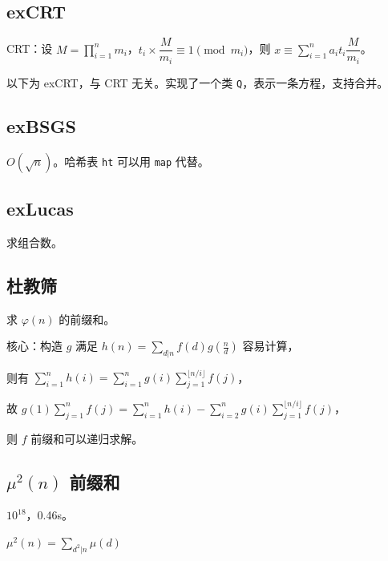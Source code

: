 \documentclass[12pt]{ctexart}
\begin{document}


\subsection{exCRT}

CRT：设 $M=\prod\limits_{i=1}^nm_i$，$t_i\times \dfrac {M}{m_i}\equiv 1\pmod {m_i}$，则 $x\equiv \sum\limits_{i=1}^na_it_i\dfrac {M}{m_i}$。

以下为 exCRT，与 CRT 无关。实现了一个类 \verb|Q|，表示一条方程，支持合并。




\subsection{exBSGS}

$O(\sqrt n)$。哈希表 \verb|ht| 可以用 \verb|map| 代替。



\subsection{exLucas}

求组合数。



\subsection{杜教筛}

求 $\varphi(n)$ 的前缀和。

核心：构造 $g$ 满足 $h(n)=\sum\limits_{d|n}f(d)g(\frac{n}{d})$ 容易计算，

则有 $\sum\limits_{i=1}^n h(i)=\sum\limits_{i=1}^n g(i)\sum\limits_{j=1}^{\lfloor n/i\rfloor}f(j)$，

故 $g(1)\sum\limits_{j=1}^n f(j)=\sum\limits_{i=1}^n h(i)-\sum\limits_{i=2}^n g(i)\sum\limits_{j=1}^{\lfloor n/i\rfloor}f(j)$，

则 $f$ 前缀和可以递归求解。



\subsection{$\mu^2(n)$ 前缀和}

$10^{18}$，0.46s。

$\mu^2(n)=\sum\limits_{d^2|n}\mu(d)$
\end{document}
